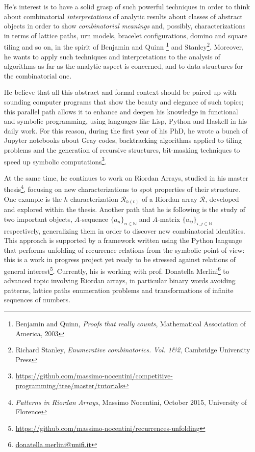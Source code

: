 \documentclass[10pt,a4paper]{scrartcl}
\begin{document}
    He's interest is to have a solid grasp of such powerful techniques in order to
    think about combinatorial \emph{interpretations} of
    analytic results about classes of abstract objects in order to show
    \emph{combinatorial meanings} and, possibly, characterizations in terms
    of lattice paths, urn models, bracelet configurations, domino and square
    tiling and so on, in the spirit of Benjamin and Quinn \footnote{Benjamin
    and Quinn, \emph{Proofs that really counts}, Mathematical Association of
    America, 2003} and Stanley\footnote{Richard Stanley, \emph{Enumerative
    combinatorics. {V}ol. 1\&2}, Cambridge University Press}. Moreover, he wants
    to apply such techniques and interpretations to the analysis of algorithms
    as far as the analytic aspect is concerned, and to data structures for the
    combinatorial one. 

    He believe that all this abstract and formal context should be paired up with
    sounding computer programs that show the beauty and elegance of such topics;
    this parallel path allows it to enhance and deepen his knowledge in functional
    and symbolic programming, using languages like Lisp, Python and Haskell in his daily work.
    For this reason, during the first year of his PhD, he wrote a bunch of Jupyter 
    notebooks about Gray codes, backtracking algorithms applied to tiling problems
    and the generation of recursive structures, bit-masking techniques to speed up
    symbolic computations\footnote{\url{https://github.com/massimo-nocentini/competitive-programming/tree/master/tutorials}}.

    At the same time, he continues to work on Riordan Arrays, studied in his
    master thesis\footnote{\textit{Patterns in Riordan Arrays}, Massimo Nocentini, October 2015, University of Florence}, 
    focusing on new characterizations to spot properties of their
    structure. One example is the $h$-characterization $\mathcal{R}_{h(t)}$ of a
    Riordan array $\mathcal{R}$, developed and explored within the thesis.
    Another path that he is following is the study of two important objects, $A$-sequence
    $\lbrace a_{n}\rbrace_{n\in\mathbb{N}}$ and $A$-matrix $\lbrace
    a_{ij}\rbrace_{i,j\in\mathbb{N}}$ respectively, generalizing them in order to
    discover new combinatorial identities. This approach is supported by a framework
    written using the Python language that performs unfolding of recurrence relations
    from the symbolic point of view: this is a work in progress project yet ready
    to be stressed against relations of general interest\footnote{\url{https://github.com/massimo-nocentini/recurrences-unfolding}}.
    Currently, his is working with prof. Donatella Merlini\footnote{\url{donatella.merlini@unifi.it}}
    to advanced topic involving Riordan arrays, in particular binary words avoiding patterns, 
    lattice paths enumeration problems and transformations of infinite sequences of numbers.
\end{document}
